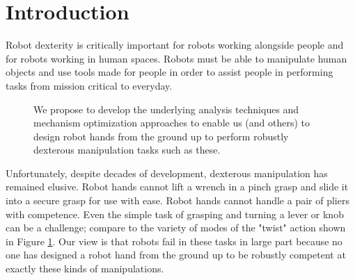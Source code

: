 \section{Introduction}

Robot dexterity is critically important for robots working alongside people and for robots working in human spaces.    Robots must be able to manipulate human objects and use tools made for people in order to assist people in performing tasks from mission critical to everyday.   

\begin{figure}
\begin{center}
\vspace*{2in}
\end{center}
\caption[]{We propose to develop the underlying analysis techniques and mechanism optimization approaches to enable us (and others) to design  robot hands from the ground up to perform robustly dexterous manipulation tasks such as these.}
\label{DexterousExamples}
\end{figure}

Unfortunately, despite decades of development, dexterous manipulation has remained elusive.   Robot hands cannot lift a wrench in a pinch grasp and slide it into a secure grasp for use with ease.   Robot hands cannot handle a pair of pliers with competence.   Even the simple task of grasping and turning a lever or knob can be a challenge;   compare to the variety of modes of the "twist" action shown in Figure \ref{DexterousExamples}.   Our view is that robots fail in these tasks in large part because no one has designed a robot hand from the ground up to be robustly competent at exactly these kinds of manipulations.

